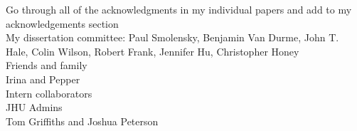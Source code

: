 
Go through all of the acknowledgments in my individual papers and add to my acknowledgements section\\
My dissertation committee: Paul Smolensky, Benjamin Van Durme, John T. Hale, Colin Wilson, Robert Frank, Jennifer Hu, Christopher Honey\\
Friends and family\\
Irina and Pepper\\
Intern collaborators\\
JHU Admins\\
Tom Griffiths and Joshua Peterson\\
